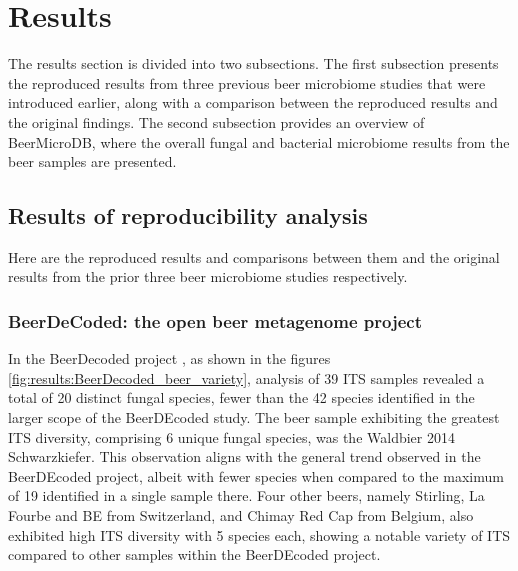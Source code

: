 \section{Results}

The results section is divided into two subsections. The first subsection presents the reproduced results from three previous beer microbiome studies that were introduced earlier, along with a comparison between the reproduced results and the original findings. The second subsection provides an overview of BeerMicroDB, where the overall fungal and bacterial microbiome results from the beer samples are presented.

\subsection{Results of reproducibility analysis}

Here are the reproduced results and comparisons between them and the original results from the prior three beer microbiome studies respectively.

\subsubsection{BeerDeCoded: the open beer metagenome project}

    In the BeerDecoded project \cite{sobel2017beerdecoded}, as shown in the figures \ref{fig:results:BeerDecoded_beer_variety}, analysis of 39 ITS samples revealed a total of 20 distinct fungal species, fewer than the 42 species identified in the larger scope of the BeerDEcoded study. The beer sample exhibiting the greatest ITS diversity, comprising 6 unique fungal species, was the Waldbier 2014 Schwarzkiefer. This observation aligns with the general trend observed in the BeerDEcoded project, albeit with fewer species when compared to the maximum of 19 identified in a single sample there. Four other beers, namely Stirling, La Fourbe and BE from Switzerland, and Chimay Red Cap from Belgium, also exhibited high ITS diversity with 5 species each, showing a notable variety of ITS compared to other samples within the BeerDEcoded project.

